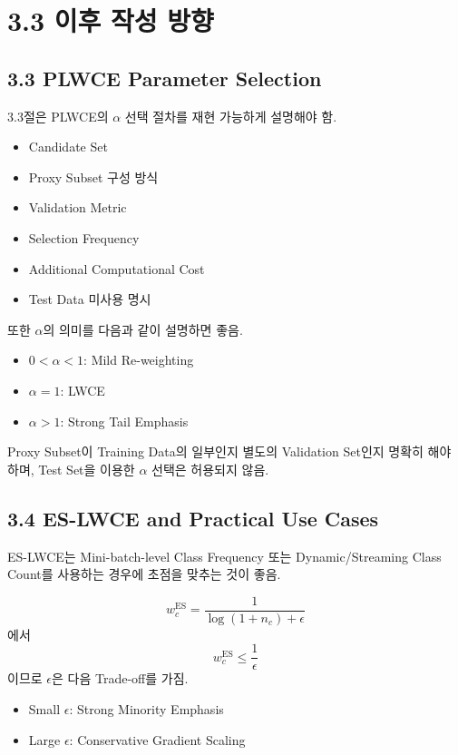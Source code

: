 \documentclass[11pt,a4paper]{article}
\begin{document}
\section{3.3 이후 작성 방향}

\subsection{3.3 PLWCE Parameter Selection}

3.3절은 PLWCE의 \(\alpha\) 선택 절차를 재현 가능하게 설명해야 함.

\begin{itemize}
\item Candidate Set
\item Proxy Subset 구성 방식
\item Validation Metric
\item Selection Frequency
\item Additional Computational Cost
\item Test Data 미사용 명시
\end{itemize}

또한 \(\alpha\)의 의미를 다음과 같이 설명하면 좋음.

\begin{itemize}
\item \(0<\alpha<1\): Mild Re-weighting
\item \(\alpha=1\): LWCE
\item \(\alpha>1\): Strong Tail Emphasis
\end{itemize}

\begin{tcolorbox}[title=주의점]
Proxy Subset이 Training Data의 일부인지 별도의 Validation Set인지 명확히 해야 하며, Test Set을 이용한 \(\alpha\) 선택은 허용되지 않음.
\end{tcolorbox}

\subsection{3.4 ES-LWCE and Practical Use Cases}

ES-LWCE는 Mini-batch-level Class Frequency 또는 Dynamic/Streaming Class Count를 사용하는 경우에 초점을 맞추는 것이 좋음.

\[
w_c^{\mathrm{ES}}
=
\frac{1}{\log(1+n_c)+\epsilon}
\]
에서
\[
w_c^{\mathrm{ES}}\leq \frac{1}{\epsilon}
\]
이므로 \(\epsilon\)은 다음 Trade-off를 가짐.

\begin{itemize}
\item Small \(\epsilon\): Strong Minority Emphasis
\item Large \(\epsilon\): Conservative Gradient Scaling
\end{itemize}
\end{document}
